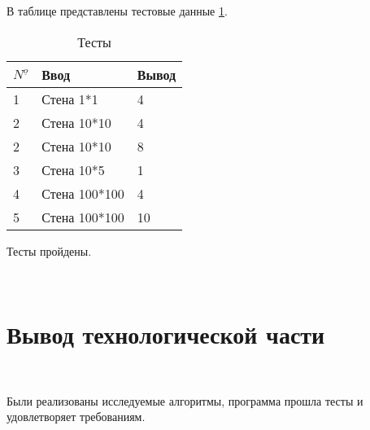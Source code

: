 В таблице представлены тестовые данные \ref{tab:matrixMultiply}.
\begin{table}[ht]
    \caption{Тесты}
    \centering
\begin{tabular}{ l | l | l }
    ${N^{\underline{o}}}$ & Ввод & Вывод   \\ \hline \hline
    1 &  Стена 1*1   &    4     \\  \hline 
    2 &  Стена 10*10   &    4    \\  \hline 
    2 &  Стена 10*10   &    8    \\  \hline 
    3 &  Стена 10*5   &    1    \\ \hline 
    4 &  Стена 100*100  &    4    \\  \hline 
    5 &  Стена 100*100  &    10    \\  \hline  
\end{tabular}
\label{tab:matrixMultiply}
\end{table}

Тесты пройдены.

~\section{Вывод технологической части}\label{TechResults}~

Были реализованы исследуемые алгоритмы, программа прошла тесты и удовлетворяет требованиям.

